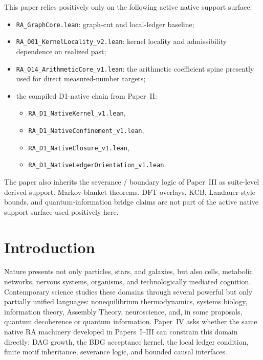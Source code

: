 \documentclass[11pt]{article}
\begin{document}
\begin{tcolorbox}[title=Active Native Support Surface Used Positively,colback=gray!5,colframe=gray!60]
This paper relies positively only on the following active native support surface:
\begin{itemize}[nosep]
    \item \texttt{RA\_GraphCore.lean}: graph-cut and local-ledger baseline;
    \item \texttt{RA\_O01\_KernelLocality\_v2.lean}: kernel locality and admissibility dependence on realized past;
    \item \texttt{RA\_O14\_ArithmeticCore\_v1.lean}: the arithmetic coefficient spine presently used for direct measured-number targets;
    \item the compiled D1-native chain from Paper~II:
    \begin{itemize}[nosep]
        \item \texttt{RA\_D1\_NativeKernel\_v1.lean},
        \item \texttt{RA\_D1\_NativeConfinement\_v1.lean},
        \item \texttt{RA\_D1\_NativeClosure\_v1.lean},
        \item \texttt{RA\_D1\_NativeLedgerOrientation\_v1.lean}.
    \end{itemize}
\end{itemize}
The paper also inherits the severance / boundary logic of Paper~III as suite-level derived support. Markov-blanket theorems, DFT overlays, KCB, Landauer-style bounds, and quantum-information bridge claims are not part of the active native support surface used positively here.
\end{tcolorbox}

\section{Introduction}

Nature presents not only particles, stars, and galaxies, but also cells, metabolic networks, nervous systems, organisms, and technologically mediated cognition. Contemporary science studies these domains through several powerful but only partially unified languages: nonequilibrium thermodynamics, systems biology, information theory, Assembly Theory, neuroscience, and, in some proposals, quantum decoherence or quantum information. Paper~IV asks whether the same native RA machinery developed in Papers~I--III can constrain this domain directly: DAG growth, the BDG acceptance kernel, the local ledger condition, finite motif inheritance, severance logic, and bounded causal interfaces.
\end{document}
